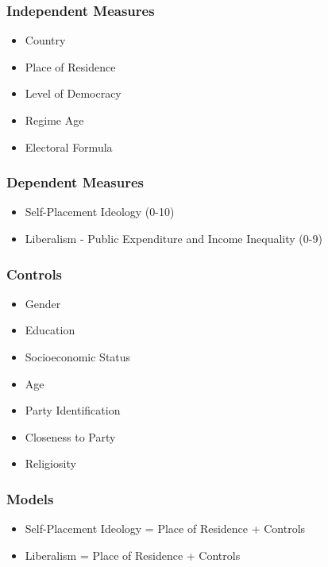 \documentclass[20pt]{beamer}
\begin{document}
\begin{frame}
\frametitle{Independent Measures}
\begin{itemize}
	\item Country
	\item Place of Residence
	\item Level of Democracy
	\item Regime Age
	\item Electoral Formula
\end{itemize}
\end{frame}

\begin{frame}
\frametitle{Dependent Measures}
\begin{itemize}
	\item Self-Placement Ideology (0-10)
	\item Liberalism - Public Expenditure and Income Inequality (0-9)
\end{itemize}
\end{frame}

\begin{frame}
\frametitle{Controls}
\begin{itemize}
	\item Gender
	\item Education
	\item Socioeconomic Status
	\item Age
	\item Party Identification
	\item Closeness to Party
	\item Religiosity
\end{itemize}
\end{frame}

\begin{frame}
\normalsize
\frametitle{Models}
\begin{itemize}
	\item Self-Placement Ideology = Place of Residence + Controls
	\item Liberalism = Place of Residence + Controls
\end{itemize}
\end{frame}
\end{document}
